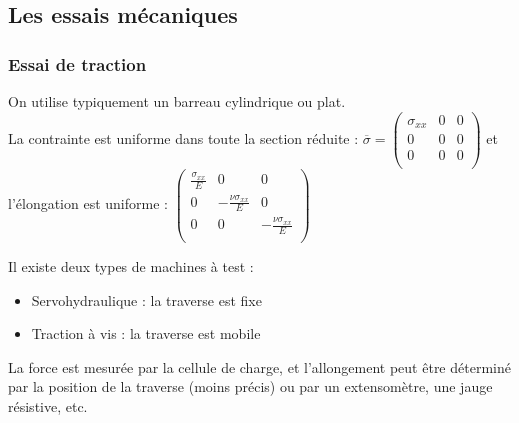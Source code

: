 \documentclass[../main.tex]{subfiles}
\begin{document}
\localtableofcontents
\subsection{Les essais mécaniques}
\subsubsection{Essai de traction}
On utilise typiquement un barreau cylindrique ou plat.\\
La contrainte est uniforme dans toute la section réduite : $\overline{\sigma} = \begin{pmatrix}
    \sigma_{xx} & 0 & 0\\
    0 & 0 & 0\\
    0 & 0 & 0\\
\end{pmatrix}$ et l'élongation est uniforme : $\begin{pmatrix}
    \frac{\sigma_{xx}}{E} & 0 & 0\\
    0 & -\frac{\nu \sigma_{xx}}{E} & 0\\
    0 & 0 & -\frac{\nu \sigma_{xx}}{E}\\
\end{pmatrix}$

Il existe deux types de machines à test : \\
\begin{itemize}
    \item Servohydraulique : la traverse est fixe\\
    \item Traction à vis : la traverse est mobile\\
\end{itemize}

La force est mesurée par la cellule de charge, et l'allongement peut être déterminé par la position de la traverse (moins précis) ou par un extensomètre, une jauge résistive, etc.\\
\end{document}
